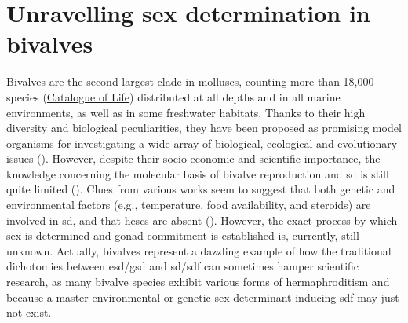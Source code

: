 \section{Unravelling sex determination in bivalves}
Bivalves are the second largest clade in molluscs, counting more than 18,000 species (\href{https://www.catalogueoflife.org/}{Catalogue of Life}) distributed at all depths and in all marine environments, as well as in some freshwater habitats. Thanks to their high diversity and biological peculiarities, they have been proposed as promising model organisms for investigating a wide array of biological, ecological and evolutionary issues (\textbf{\cite{milani2020faraway,ghiselli2021bivalve}}). However, despite their socio-economic and scientific importance, the knowledge concerning the molecular basis of bivalve reproduction and \gls{sd} is still quite limited (\textbf{\cite{breton2018sex}}). Clues from various works seem to suggest that both genetic and environmental factors (e.g., temperature, food availability, and steroids) are involved in \gls{sd}, and that \glspl{hesc} are absent (\textbf{\cite{breton2018sex,han2022ancient}}). However, the exact process by which sex is determined and gonad commitment is established is, currently, still unknown. Actually, bivalves represent a dazzling example of how the traditional dichotomies between \gls{esd}/\gls{gsd} and \gls{sd}/\gls{sdf} can sometimes hamper scientific research, as many bivalve species exhibit various forms of hermaphroditism and because a master environmental or genetic sex determinant inducing \gls{sdf} may just not exist.


